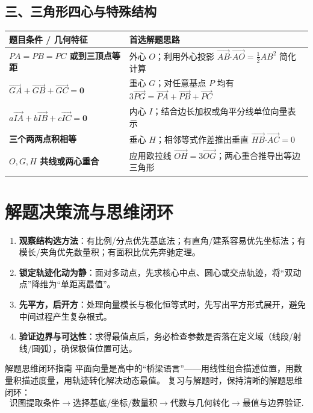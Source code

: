 \documentclass[11pt,a4paper,openany]{ctexbook}
\newcommand{\vect}[1]{\overrightarrow{#1}}
\newcommand{\vv}[1]{\bm{#1}}
\newcommand{\dotp}{\mathbin{\boldsymbol\cdot}}
\begin{document}
\subsection{三、三角形四心与特殊结构}
\begin{center}
\begin{tabularx}{0.98\textwidth}{>{\bfseries}p{4.2cm}X}
\toprule
题目条件 / 几何特征 & 首选解题思路\\
\midrule
\(PA=PB=PC\) 或到三顶点等距 & 外心 \(O\)；利用外心投影 \(\vect{AB}\dotp\vect{AO}=\frac12AB^2\) 简化计算\\
\(\vect{GA}+\vect{GB}+\vect{GC}=\vv0\) & 重心 \(G\)；对任意基点 \(P\) 均有 \(3\vect{PG}=\vect{PA}+\vect{PB}+\vect{PC}\)\\
\(a\vect{IA}+b\vect{IB}+c\vect{IC}=\vv0\) & 内心 \(I\)；结合边长加权或角平分线单位向量表示\\
三个两两点积相等 & 垂心 \(H\)；相邻等式作差推出垂直 \(\vect{HB}\dotp\vect{AC}=0\)\\
\(O,G,H\) 共线或两心重合 & 应用欧拉线 \(\vect{OH}=3\vect{OG}\)；两心重合推导出等边三角形\\
\bottomrule
\end{tabularx}
\end{center}

\section{解题决策流与思维闭环}

\begin{methodbox}[title={考场解题四步决策法}]
\begin{enumerate}
  \item \textbf{观察结构选方法}：有比例/分点优先基底法；有直角/建系容易优先坐标法；有模长/夹角优先数量积；有面积比优先奔驰定理。
  \item \textbf{锁定轨迹化动为静}：面对多动点，先求核心中点、圆心或交点轨迹，将“双动点”降维为“单距离最值”。
  \item \textbf{先平方，后开方}：处理向量模长与极化恒等式时，先写出平方形式展开，避免中间过程产生复杂根式。
  \item \textbf{验证边界与可达性}：求得最值点后，务必检查参数是否落在定义域（线段/射线/圆弧），确保极值位置可达。
\end{enumerate}
\end{methodbox}

\begin{summarybox}{解题思维闭环指南}
平面向量是高中的“桥梁语言”——用线性组合描述位置，用数量积描述度量，用轨迹转化解决动态最值。
复习与解题时，保持清晰的解题思维闭环：
\[
\text{识图提取条件}
\longrightarrow
\text{选择基底/坐标/数量积}
\longrightarrow
\text{代数与几何转化}
\longrightarrow
\text{最值与边界验证}.
\]
\end{summarybox}
\end{document}
